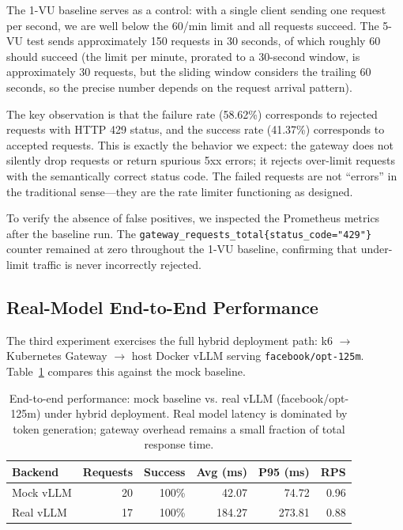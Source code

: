 \documentclass[10pt,journal]{IEEEtran}
\begin{document}
The 1-VU baseline serves as a control: with a single client sending one request per second, we are well below the 60/min limit and all requests succeed. The 5-VU test sends approximately 150 requests in 30 seconds, of which roughly 60 should succeed (the limit per minute, prorated to a 30-second window, is approximately 30 requests, but the sliding window considers the trailing 60 seconds, so the precise number depends on the request arrival pattern).

The key observation is that the failure rate (58.62\%) corresponds to rejected requests with HTTP 429 status, and the success rate (41.37\%) corresponds to accepted requests. This is exactly the behavior we expect: the gateway does not silently drop requests or return spurious 5xx errors; it rejects over-limit requests with the semantically correct status code. The failed requests are not ``errors'' in the traditional sense---they are the rate limiter functioning as designed.

To verify the absence of false positives, we inspected the Prometheus metrics after the baseline run. The \texttt{gateway\_requests\_total\{status\_code="429"\}} counter remained at zero throughout the 1-VU baseline, confirming that under-limit traffic is never incorrectly rejected.

\subsection{Real-Model End-to-End Performance}

The third experiment exercises the full hybrid deployment path: k6 $\rightarrow$ Kubernetes Gateway $\rightarrow$ host Docker vLLM serving \texttt{facebook/opt-125m}. Table~\ref{tab:real} compares this against the mock baseline.

\begin{table}[t]
\centering
\caption{End-to-end performance: mock baseline vs. real vLLM (facebook/opt-125m) under hybrid deployment. Real model latency is dominated by token generation; gateway overhead remains a small fraction of total response time.}
\label{tab:real}
\begin{tabular}{lrrrrr}
\toprule
\textbf{Backend} & \textbf{Requests} & \textbf{Success} & \textbf{Avg (ms)} & \textbf{P95 (ms)} & \textbf{RPS} \\
\midrule
Mock vLLM  & 20 & 100\% &  42.07 &  74.72 & 0.96 \\
Real vLLM  & 17 & 100\% & 184.27 & 273.81 & 0.88 \\
\bottomrule
\end{tabular}
\end{table}
\end{document}
